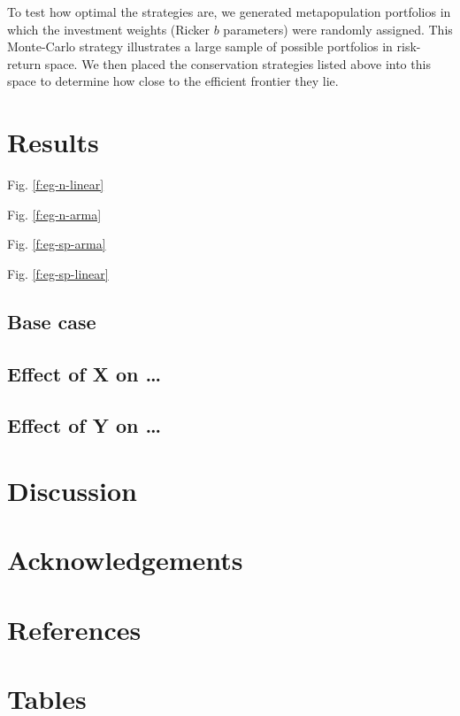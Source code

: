 To test how optimal the strategies are, we generated metapopulation
portfolios in which the investment weights (Ricker $b$ parameters) were
randomly assigned. This Monte-Carlo strategy illustrates a large sample
of possible portfolios in risk-return space. We then placed the
conservation strategies listed above into this space to determine how
close to the efficient frontier they lie.

\section{Results}

Fig. \ref{f:eg-n-linear}

Fig. \ref{f:eg-n-arma}

Fig. \ref{f:eg-sp-arma}

Fig. \ref{f:eg-sp-linear}

\subsection{Base case}

\subsection{Effect of X on \ldots{}}

\subsection{Effect of Y on \ldots{}}

\section{Discussion}

\section{Acknowledgements}

\section{References}





\clearpage

\section{Tables}

